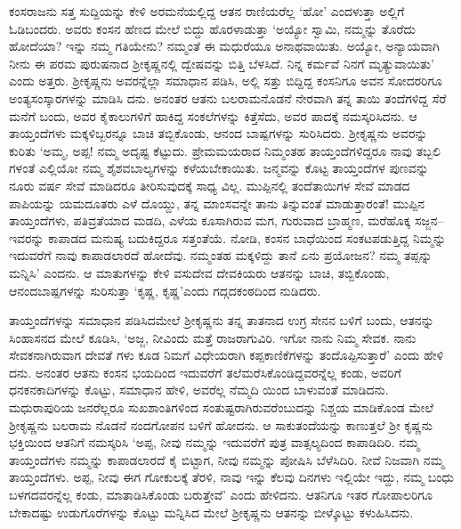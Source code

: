 ಕಂಸರಾಜನು ಸತ್ತ ಸುದ್ದಿಯನ್ನು ಕೇಳಿ ಅರಮನೆಯಲ್ಲಿದ್ದ ಆತನ ರಾಣಿಯರೆಲ್ಲ ‘ಹೋ’ ಎಂದಳುತ್ತಾ ಅಲ್ಲಿಗೆ ಓಡಿಬಂದರು. ಅವರು ಕಂಸನ ಹೆಣದ ಮೇಲೆ ಬಿದ್ದು ಹೊರಳಾಡುತ್ತಾ ‘ಅಯ್ಯೋ ಸ್ವಾಮಿ, ನಮ್ಮನ್ನು ತೊರೆದು ಹೋದೆಯಾ? ಇನ್ನು ನಮ್ಮ ಗತಿಯೇನು? ನಮ್ಮಂತೆ ಈ ಮಧುರೆಯೂ ಅನಾಥವಾಯಿತು. ಅಯ್ಯೋ, ಅನ್ಯಾಯವಾಗಿ ನೀನು ಈ ಪರಮ ಪುರುಷನಾದ ಶ್ರೀಕೃಷ್ಣನಲ್ಲಿ ದ್ವೇಷವನ್ನು ಬಿತ್ತಿ ಬೆಳಸಿದೆ. ನಿನ್ನ ಕರ್ಮವೆ ನಿನಗೆ ಮೃತ್ಯುವಾಯಿತು’ ಎಂದು ಅತ್ತರು. ಶ್ರೀಕೃಷ್ಣನು ಅವರನ್ನೆಲ್ಲಾ ಸಮಾಧಾನ ಪಡಿಸಿ, ಅಲ್ಲಿ ಸತ್ತು ಬಿದ್ದಿದ್ದ ಕಂಸನಿಗೂ ಅವನ ಸೋದರರಿಗೂ ಅಂತ್ಯಸಂಸ್ಕಾರಗಳನ್ನು ಮಾಡಿಸಿ ದನು. ಅನಂತರ ಆತನು ಬಲರಾಮನೊಡನೆ ನೇರವಾಗಿ ತನ್ನ ತಾಯಿ ತಂದೆಗಳಿದ್ದ ಸೆರೆ ಮನೆಗೆ ಬಂದು, ಅವರ ಕೈಕಾಲುಗಳಿಗೆ ಹಾಕಿದ್ದ ಸಂಕಲೆಗಳನ್ನು ಕಿತ್ತೆಸೆದು, ಅವರ ಪಾದಕ್ಕೆ ನಮಸ್ಕರಿಸಿದನು. ಆ ತಾಯ್ತಂದೆಗಳು ಮಕ್ಕಳಿಬ್ಬರನ್ನೂ ಬಾಚಿ ತಬ್ಬಿಕೊಂಡು, ಆನಂದ ಬಾಷ್ಪಗಳನ್ನು ಸುರಿಸಿದರು. ಶ್ರೀಕೃಷ್ಣನು ಅವರನ್ನು ಕುರಿತು ‘ಅಮ್ಮ, ಅಪ್ಪ! ನಮ್ಮ ಅದೃಷ್ಟ ಕೆಟ್ಟುದು. ಪ್ರೇಮಮಯರಾದ ನಿಮ್ಮಂತಹ ತಾಯ್ತಂದೆಗಳಿದ್ದರೂ ನಾವು ತಬ್ಬಲಿ ಗಳಂತೆ ಎಲ್ಲಿಯೋ ನಮ್ಮ ಶೈಶವಬಾಲ್ಯಗಳನ್ನು ಕಳೆಯಬೇಕಾಯಿತು. ಜನ್ಮವನ್ನು ಕೊಟ್ಟ ತಾಯ್ತಂದೆಗಳ ಪುಣವನ್ನು ನೂರು ವರ್ಷ ಸೇವೆ ಮಾಡಿದರೂ ತೀರಿಸುವುದಕ್ಕೆ ಸಾಧ್ಯ ವಿಲ್ಲ. ಮುಪ್ಪಿನಲ್ಲಿ ತಂದೆತಾಯಿಗಳ ಸೇವೆ ಮಾಡದ ಪಾಪಿಯನ್ನು ಯಮದೂತರು ಎಳೆ ದೊಯ್ದು, ತನ್ನ ಮಾಂಸವನ್ನೇ ತಾನು ತಿನ್ನುವಂತೆ ಮಾಡುತ್ತಾರಂತೆ! ಮುಪ್ಪಿನ ತಾಯ್ತಂದೆಗಳು, ಪತಿವ್ರತೆಯಾದ ಮಡದಿ, ಎಳೆಯ ಕೂಸಾಗಿರುವ ಮಗ, ಗುರುವಾದ ಬ್ರಾಹ್ಮಣ, ಮರೆಹೊಕ್ಕ ಸಜ್ಜನ–ಇವರನ್ನು ಕಾಪಾಡದ ಮನುಷ್ಯ ಬದುಕಿದ್ದರೂ ಸತ್ತಂತೆಯೆ. ನೋಡಿ, ಕಂಸನ ಬಾಧೆಯಿಂದ ಸಂಕಟಪಡುತ್ತಿದ್ದ ನಿಮ್ಮನ್ನು ಇದುವರೆಗೆ ನಾವು ಕಾಪಾಡಲಾರದೆ ಹೋದೆವು. ನಮ್ಮಂತಹ ಮಕ್ಕಳಿದ್ದು ತಾನೆ ಏನು ಪ್ರಯೋಜನ? ನಮ್ಮ ತಪ್ಪನ್ನು ಮನ್ನಿಸಿ’ ಎಂದನು. ಆ ಮಾತುಗಳನ್ನು ಕೇಳಿ ವಸುದೇವ ದೇವಕಿಯರು ಆತನನ್ನು ಬಾಚಿ, ತಬ್ಬಿಕೊಂಡು, ಆನಂದಬಾಷ್ಪಗಳನ್ನು ಸುರಿಸುತ್ತಾ ‘ಕೃಷ್ಣ, ಕೃಷ್ಣ’ಎಂದು ಗದ್ಗದಕಂಠದಿಂದ ನುಡಿದರು. 

ತಾಯ್ತಂದೆಗಳನ್ನು ಸಮಾಧಾನ ಪಡಿಸಿದಮೇಲೆ ಶ್ರೀಕೃಷ್ಣನು ತನ್ನ ತಾತನಾದ ಉಗ್ರ ಸೇನನ ಬಳಿಗೆ ಬಂದು, ಆತನನ್ನು ಸಿಂಹಾಸನದ ಮೇಲೆ ಕೂಡಿಸಿ, ‘ಅಜ್ಜ, ನೀವಿಂದು ಮತ್ತೆ ರಾಜರಾಗುವಿರಿ. ಇಗೋ ನಾನು ನಿಮ್ಮ ಸೇವಕ. ನಾನು ಸೇವಕನಾಗಿರುವಾಗ ದೇವತೆ ಗಳು ಕೂಡ ನಿಮಗೆ ವಿಧೇಯರಾಗಿ ಕಪ್ಪಕಾಣಿಕೆಗಳನ್ನು ತಂದೊಪ್ಪಿಸುತ್ತಾರೆ’ ಎಂದು ಹೇಳಿ ದನು. ಅನಂತರ ಆತನು ಕಂಸನ ಭಯದಿಂದ ಇದುವರೆಗೆ ತಲೆಮರೆಸಿಕೊಂಡಿದ್ದವರನ್ನೆಲ್ಲ ಕಂಡು, ಅವರಿಗೆ ಧನಕನಕಾದಿಗಳನ್ನು ಕೊಟ್ಟು, ಸಮಾಧಾನ ಹೇಳಿ, ಅವರೆಲ್ಲ ನೆಮ್ಮದಿ ಯಿಂದ ಬಾಳುವಂತೆ ಮಾಡಿದನು. ಮಧುರಾಪುರಿಯ ಜನರೆಲ್ಲರೂ ಸುಖಶಾಂತಿಗಳಿಂದ ಸಂತುಷ್ಟರಾಗಿರುವರೆಂಬುದನ್ನು ನಿಶ್ಚಯ ಮಾಡಿಕೊಂಡ ಮೇಲೆ ಶ್ರೀಕೃಷ್ಣನು ಬಲರಾಮ ನೊಡನೆ ನಂದಗೋಪನ ಬಳಿಗೆ ಹೋದನು. ಆ ಸಾಕುತಂದೆಯನ್ನು ಕಾಣುತ್ತಲೆ ಶ್ರೀ ಕೃಷ್ಣನು ಭಕ್ತಿಯಿಂದ ಆತನಿಗೆ ನಮಸ್ಕರಿಸಿ ‘ಅಪ್ಪ, ನೀವು ನಮ್ಮನ್ನು ಇದುವರೆಗೆ ಪುತ್ರ ವಾತ್ಸಲ್ಯದಿಂದ ಕಾಪಾಡಿದಿರಿ. ನಮ್ಮ ತಾಯ್ತಂದೆಗಳು ನಮ್ಮನ್ನು ಕಾಪಾಡಲಾರದೆ ಕೈ ಬಿಟ್ಟಾಗ, ನೀವು ನಮ್ಮನ್ನು ಪೋಷಿಸಿ ಬೆಳೆಸಿದಿರಿ. ನೀವೆ ನಿಜವಾಗಿ ನಮ್ಮ ತಾಯ್ತಂದೆಗಳು. ಅಪ್ಪ, ನೀವು ಈಗ ಗೋಕುಲಕ್ಕೆ ತೆರಳಿ, ನಾವು ಇನ್ನು ಕೆಲವು ದಿನಗಳು ಇಲ್ಲಿಯೇ ಇದ್ದು, ನಮ್ಮ ಬಂಧು ಬಳಗದವರನ್ನೆಲ್ಲ ಕಂಡು, ಮಾತಾಡಿಸಿಕೊಂಡು ಬರುತ್ತೇವೆ’ ಎಂದು ಹೇಳಿದನು. ಆತನಿಗೂ ಇತರ ಗೋಪಾಲರಿಗೂ ಬೇಕಾದಷ್ಟು ಉಡುಗೊರೆಗಳನ್ನು ಕೊಟ್ಟು ಮನ್ನಿಸಿದ ಮೇಲೆ ಶ್ರೀಕೃಷ್ಣನು ಆತನನ್ನು ಬೀಳ್ಕೊಟ್ಟು ಕಳುಹಿಸಿದನು.


